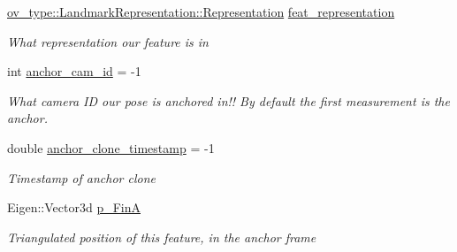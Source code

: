 \begin{DoxyCompactItemize}
\mbox{\label{structov__msckf_1_1UpdaterHelper_1_1UpdaterHelperFeature_a31e055121de04496fe06631b1352d62e}} 
\hyperlink{classov__type_1_1LandmarkRepresentation_a7f5783df6932ace7f098ae243b6d298e}{ov\+\_\+type\+::\+Landmark\+Representation\+::\+Representation} \hyperlink{structov__msckf_1_1UpdaterHelper_1_1UpdaterHelperFeature_a31e055121de04496fe06631b1352d62e}{feat\+\_\+representation}
\begin{DoxyCompactList}\small\item\em What representation our feature is in \end{DoxyCompactList}\item 
\mbox{\label{structov__msckf_1_1UpdaterHelper_1_1UpdaterHelperFeature_a474d6bd5344818e899ba1b03c261fc9c}} 
int \hyperlink{structov__msckf_1_1UpdaterHelper_1_1UpdaterHelperFeature_a474d6bd5344818e899ba1b03c261fc9c}{anchor\+\_\+cam\+\_\+id} = -\/1
\begin{DoxyCompactList}\small\item\em What camera ID our pose is anchored in!! By default the first measurement is the anchor. \end{DoxyCompactList}\item 
\mbox{\label{structov__msckf_1_1UpdaterHelper_1_1UpdaterHelperFeature_a41aaaf3a4c85bb1669b0d56e78c5f851}} 
double \hyperlink{structov__msckf_1_1UpdaterHelper_1_1UpdaterHelperFeature_a41aaaf3a4c85bb1669b0d56e78c5f851}{anchor\+\_\+clone\+\_\+timestamp} = -\/1
\begin{DoxyCompactList}\small\item\em Timestamp of anchor clone \end{DoxyCompactList}\item 
\mbox{\label{structov__msckf_1_1UpdaterHelper_1_1UpdaterHelperFeature_a2e0ab4cc6215ee1bff8ccbe0cefcc349}} 
Eigen\+::\+Vector3d \hyperlink{structov__msckf_1_1UpdaterHelper_1_1UpdaterHelperFeature_a2e0ab4cc6215ee1bff8ccbe0cefcc349}{p\+\_\+\+FinA}
\begin{DoxyCompactList}\small\item\em Triangulated position of this feature, in the anchor frame \end{DoxyCompactList}\item 

\end{DoxyCompactItemize}
